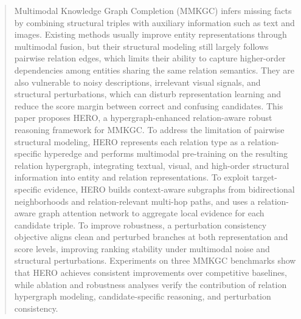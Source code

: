 \documentclass[a4paper,fleqn]{cas-sc}
\begin{document}






\begin{abstract}
Multimodal Knowledge Graph Completion (MMKGC) infers missing facts by combining structural triples with auxiliary information such as text and images. Existing methods usually improve entity representations through multimodal fusion, but their structural modeling still largely follows pairwise relation edges, which limits their ability to capture higher-order dependencies among entities sharing the same relation semantics. They are also vulnerable to noisy descriptions, irrelevant visual signals, and structural perturbations, which can disturb representation learning and reduce the score margin between correct and confusing candidates. This paper proposes HERO, a hypergraph-enhanced relation-aware robust reasoning framework for MMKGC. To address the limitation of pairwise structural modeling, HERO represents each relation type as a relation-specific hyperedge and performs multimodal pre-training on the resulting relation hypergraph, integrating textual, visual, and high-order structural information into entity and relation representations. To exploit target-specific evidence, HERO builds context-aware subgraphs from bidirectional neighborhoods and relation-relevant multi-hop paths, and uses a relation-aware graph attention network to aggregate local evidence for each candidate triple. To improve robustness, a perturbation consistency objective aligns clean and perturbed branches at both representation and score levels, improving ranking stability under multimodal noise and structural perturbations. Experiments on three MMKGC benchmarks show that HERO achieves consistent improvements over competitive baselines, while ablation and robustness analyses verify the contribution of relation hypergraph modeling, candidate-specific reasoning, and perturbation consistency.

\end{abstract}
\end{document}
